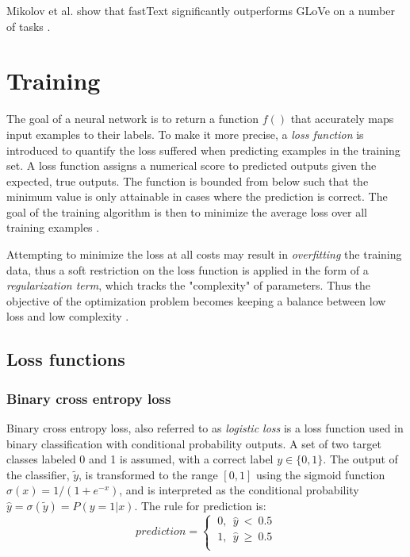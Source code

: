 Mikolov et al. show that fastText significantly outperforms GLoVe on a number of tasks \cite{mikolov2017}.


\section{Training} \label{Training}
The goal of a neural network is to return a function $f()$ that accurately maps input examples to their labels.
To make it more precise, a \textit{loss function} is introduced to quantify the loss suffered when predicting examples in the training set.
A loss function assigns a numerical score to predicted outputs given the expected, true outputs.
The function is bounded from below such that the minimum value is only attainable in cases where the prediction is correct.
The goal of the training algorithm is then to minimize the average loss over all training examples \cite{goldberg2017}.

Attempting to minimize the loss at all costs may result in \textit{overfitting} the training data, thus a soft restriction on the loss function is applied in the form of a \textit{regularization term}, which tracks the "complexity" of parameters.
Thus the objective of the optimization problem becomes keeping a balance between low loss and low complexity \cite{goldberg2017}.

\subsection{Loss functions}\label{Loss functions}
\subsubsection{Binary cross entropy loss}\label{Binary cross entropy loss}
Binary cross entropy loss, also referred to as \textit{logistic loss} is a loss function used in binary classification with conditional probability outputs.
A set of two target classes labeled 0 and 1 is assumed, with a correct label $y\in{}\{0,1\}$.
The output of the classifier, $\tilde{y}$, is transformed to the range $[0, 1]$ using the sigmoid function $\sigma{}(x)=1/(1+e^{-x})$, and is interpreted as the conditional probability $\hat{y}=\sigma{}(\tilde{y}) = P(y=1|x)$.
The rule for prediction is:
\begin{equation}
prediction =
\begin{cases}
  \  0,\ \ \hat{y}\ <\ 0.5\\
  \ 1,\ \ \hat{y}\ \geq \ 0.5\\
\end{cases}
\end{equation}

